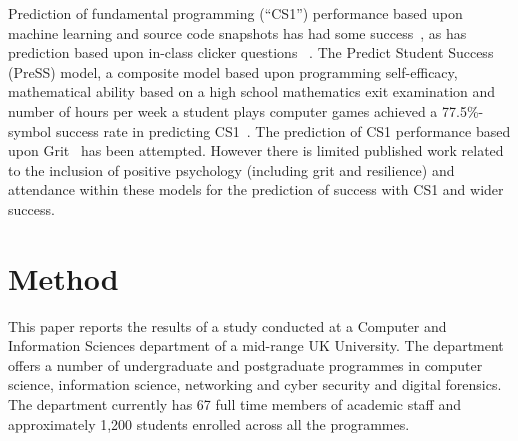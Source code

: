 \documentclass[sigconf]{acmart}
\begin{document}
Prediction of fundamental programming (``CS1'') performance based upon machine learning and source code snapshots has had some success~\cite{Ahadi:2015:EML:2787622.2787717,Castro-Wunsch:2017:ENN:3017680.3017792}, as has prediction based upon in-class clicker questions ~\cite{Liao:2016:LEI:2960310.2960315,Liao:2019:RML:3308443.3277569}. The Predict Student Success (PreSS) model, a composite model based upon programming self-efficacy, mathematical ability
based on a high school mathematics exit examination and number of hours per week a student plays computer games achieved a 77.5\%-symbol success rate in predicting CS1~\cite{Quille:2018:PPS:3197091.3197101}. The prediction of CS1 performance based upon Grit~\cite{Sigurdson:2018:EGC:3279720.3279743} has been attempted. However there is limited published work related to the inclusion of positive psychology (including grit and resilience) and attendance within these models for the prediction of success with CS1 and wider success.

\section {Method}

This paper reports the results of a study conducted at a Computer and Information Sciences department of a mid-range UK University.  The department offers a number of undergraduate and postgraduate programmes in computer science, information science, networking and cyber security and digital forensics. The department currently has 67 full time members of academic staff and approximately 1,200 students enrolled across all the programmes. 
\end{document}
